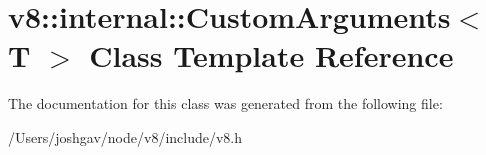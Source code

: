 \hypertarget{classv8_1_1internal_1_1_custom_arguments}{}\section{v8\+:\+:internal\+:\+:Custom\+Arguments$<$ T $>$ Class Template Reference}
\label{classv8_1_1internal_1_1_custom_arguments}


The documentation for this class was generated from the following file\+:\begin{DoxyCompactItemize}
\item 
/\+Users/joshgav/node/v8/include/v8.\+h\end{DoxyCompactItemize}
